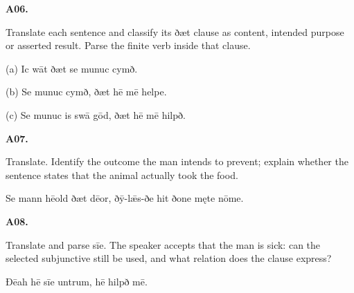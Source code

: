 \par\begin{minipage}{\linewidth}\raggedright
\textbf{A06.}

Translate each sentence and classify its ðæt clause as content, intended purpose or asserted result. Parse the finite verb inside that clause.

(a) Ic wāt ðæt se munuc cymð.

(b) Se munuc cymð, ðæt hē mē helpe.

(c) Se munuc is swā gōd, ðæt hē mē hilpð.

\end{minipage}\par\addvspace{4pt}

\par\begin{minipage}{\linewidth}\raggedright
\textbf{A07.}

Translate. Identify the outcome the man intends to prevent; explain whether the sentence states that the animal actually took the food.

Se mann hēold ðæt dēor, ðȳ-lǣs-ðe hit ðone męte nōme.

\end{minipage}\par\addvspace{4pt}

\par\begin{minipage}{\linewidth}\raggedright
\textbf{A08.}

Translate and parse sīe. The speaker accepts that the man is sick: can the selected subjunctive still be used, and what relation does the clause express?

Ðēah hē sīe untrum, hē hilpð mē.

\end{minipage}\par\addvspace{4pt}

